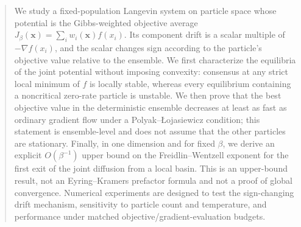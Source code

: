 \documentclass{article}
\theoremstyle{plain}
\theoremstyle{definition}
\theoremstyle{remark}
\begin{document}
\begin{abstract}
We study a fixed-population Langevin system on particle space whose potential is the Gibbs-weighted objective average
\(J_\beta(\mathbf{x})=\sum_i w_i(\mathbf{x})f(x_i)\).  Its component drift is a scalar multiple of \(-\nabla f(x_i)\), and the scalar changes sign according to the particle's objective value relative to the ensemble.  We first characterize the equilibria of the joint potential without imposing convexity: consensus at any strict local minimum of \(f\) is locally stable, whereas every equilibrium containing a noncritical zero-rate particle is unstable.  We then prove that the best objective value in the deterministic ensemble decreases at least as fast as ordinary gradient flow under a Polyak--\L{}ojasiewicz condition; this statement is ensemble-level and does not assume that the other particles are stationary.  Finally, in one dimension and for fixed \(\beta\), we derive an explicit \(O(\beta^{-1})\) upper bound on the Freidlin--Wentzell exponent for the first exit of the joint diffusion from a local basin.  This is an upper-bound result, not an Eyring--Kramers prefactor formula and not a proof of global convergence.  Numerical experiments are designed to test the sign-changing drift mechanism, sensitivity to particle count and temperature, and performance under matched objective/gradient-evaluation budgets.
\end{abstract}

\end{document}
